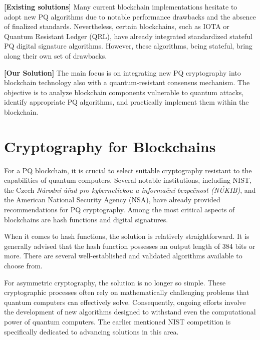 \documentclass{ExcelAtFIT}
\begin{document}
\textbf{[Existing solutions]} Many current blockchain implementations hesitate to adopt new PQ algorithms due to notable performance drawbacks and the absence of finalized standards. Nevertheless, certain blockchains, such as IOTA or Quantum Resistant Ledger (QRL), have already integrated standardized stateful PQ digital signature algorithms. However, these algorithms, being stateful, bring along their own set of drawbacks.

\textbf{[Our Solution]} The main focus is on integrating new PQ cryptography into blockchain technology also with a quantum-resistant consensus mechanism. The objective is to analyze blockchain components vulnerable to quantum attacks, identify appropriate PQ algorithms, and practically implement them within the blockchain.


\section{Cryptography for Blockchains}
\label{sec:PQBCrypto}

For a PQ blockchain, it is crucial to select suitable cryptography resistant to the capabilities of quantum computers. Several notable institutions, including NIST, the Czech \emph{Národní úřad pro kybernetickou a informační bezpečnost (NÚKIB)}, and the American National Security Agency (NSA), have already provided recommendations for PQ cryptography. Among the most critical aspects of blockchains are hash functions and digital signatures.

When it comes to hash functions, the solution is relatively straightforward. It is generally advised that the hash function possesses an output length of 384 bits or more. There are several well-established and validated algorithms available to choose from.

For asymmetric cryptography, the solution is no longer so simple. These cryptographic processes often rely on mathematically challenging problems that quantum computers can effectively solve. Consequently, ongoing efforts involve the development of new algorithms designed to withstand even the computational power of quantum computers. The earlier mentioned NIST competition is specifically dedicated to advancing solutions in this area. 
\end{document}
